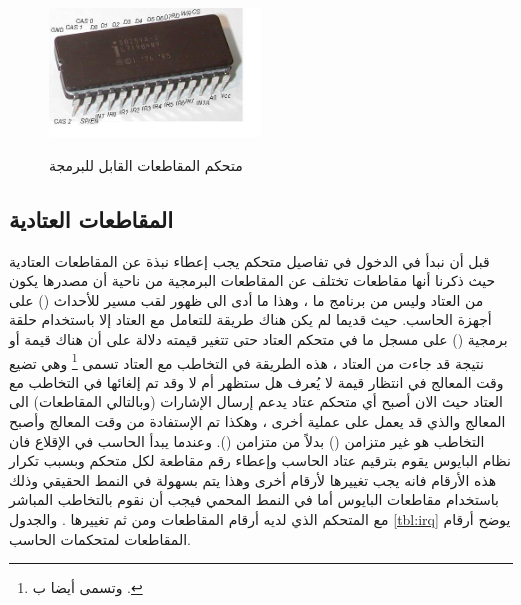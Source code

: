 \documentclass[document.tex]{subfiles}
\begin{document}
\begin{figure}[h!]
  \caption{متحكم المقاطعات القابل للبرمجة }
  \centering
   \includegraphics[width=0.5\textwidth]{../img/Intel-D8259A}
\label{fig:pic} 
\end{figure}


\subsection{المقاطعات العتادية }
قبل أن نبدأ في الدخول في تفاصيل متحكم  يجب إعطاء نبذة عن المقاطعات العتادية حيث ذكرنا أنها مقاطعات تختلف عن المقاطعات البرمجية من ناحية أن مصدرها يكون من العتاد وليس من برنامج ما ، وهذا ما أدى الى ظهور لقب مسير للأحداث () على أجهزة الحاسب. حيث قديما لم يكن هناك طريقة للتعامل مع العتاد إلا باستخدام حلقة برمجية () على مسجل ما في متحكم العتاد حتى تتغير قيمته دلالة على أن هناك قيمة أو نتيجة قد جاءت من العتاد ، هذه الطريقة في التخاطب مع العتاد تسمى \footnote{وتسمى أيضا ب .} وهي تضيع وقت المعالج في انتظار قيمة لا يُعرف هل ستظهر أم لا  وقد تم إلغائها في التخاطب مع العتاد حيث الان أصبح أي متحكم عتاد يدعم إرسال الإشارات (وبالتالي المقاطعات) الى المعالج والذي قد يعمل على عملية أخرى ، وهكذا تم الإستفادة من وقت المعالج وأصبح التخاطب هو غير متزامن () بدلاً من متزامن (). وعندما يبدأ الحاسب في الإقلاع فان نظام البايوس يقوم بترقيم عتاد الحاسب وإعطاء رقم مقاطعة لكل متحكم وبسبب تكرار هذه الأرقام فانه يجب تغييرها لأرقام أخرى وهذا يتم بسهولة في النمط الحقيقي وذلك باستخدام مقاطعات البايوس أما في النمط المحمي فيجب أن نقوم بالتخاطب المباشر مع المتحكم الذي لديه أرقام المقاطعات ومن ثم تغييرها . والجدول \ref{tbl:irq} يوضح أرقام المقاطعات لمتحكمات الحاسب.
\end{document}
